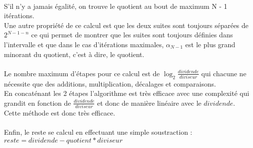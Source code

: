 \documentclass{article}
\begin{document}
\\
S'il n'y a jamais égalité, on trouve le quotient au bout de maximum N - 1 itérations.
\\
Une autre propriété de ce calcul est que les deux suites sont toujours séparées de $2^{N - 1 - n}$ ce qui permet de montrer que les suites sont toujours définies dans l'intervalle et que dans le cas
d'itérations maximales, $\alpha_{N - 1}$ est le plus grand minorant du quotient, c'est à dire, le quotient.
\\
\\
Le nombre maximum d'étapes pour ce calcul est de $\log_2{\frac{dividende}{diviseur}}$ qui chacune ne nécessite que des additions, multiplication, décalages et comparaisons.
\\
En concaténant les 2 étapes l'algorithme est très efficace avec une complexité qui grandit en fonction de $\frac{dividende}{diviseur}$ et donc de manière linéaire avec le $dividende$. Cette méthode est donc très efficace.
\\
\\
Enfin, le reste se calcul en effectuant une simple soustraction : $reste = dividende - quotient * diviseur$
\end{document}
